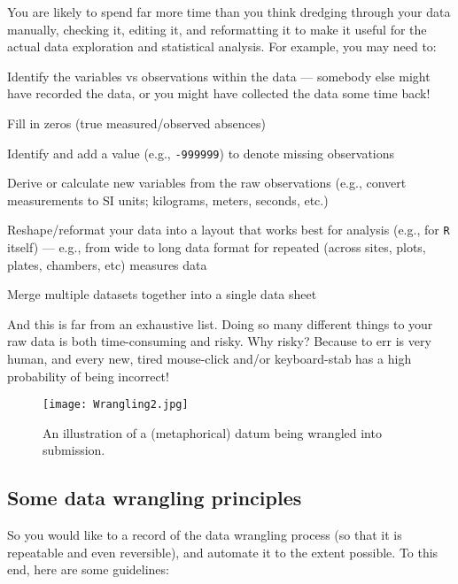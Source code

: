 You are likely to spend far more time than you think dredging through 
your data manually, checking it, editing it, and reformatting it to 
make it useful for the actual data exploration and statistical 
analysis. For example, you may need to:  
\begin{compactitem}
	\item Identify the variables vs observations within the data 
	--- somebody else might have recorded the data, or you might have 
	collected the data some time back!
	\item Fill in zeros (true measured/observed absences) 
	\item Identify and add a value (e.g., {\tt -999999}) to denote missing 
	observations	
	\item Derive or calculate new variables from the raw observations 
	(e.g., convert measurements to SI units; kilograms, meters, seconds, 
	etc.)
	\item Reshape/reformat your data into a layout that works best for 
	analysis (e.g., for {\tt R} itself) --- e.g., from wide to long data 
	format for repeated (across sites, plots, plates, chambers, etc) 
	measures data
	\item Merge multiple datasets together into a single data sheet
\end{compactitem}
And this is far from an exhaustive list. Doing so many different things 
to your raw data is both time-consuming and risky. Why risky? Because 
to err is very human, and every new, tired mouse-click and/or 
keyboard-stab has a high probability of being incorrect!  

\begin{figure}
	\begin{center}
    \texttt{[image: Wrangling2.jpg]}
\end{center}
\caption{An illustration of a (metaphorical) datum being wrangled into submission.}
\end{figure}

\subsection{Some data wrangling principles} 
So you would like to a record of the data wrangling process (so that it 
is repeatable and even reversible), and automate it to the extent 
possible. To this end, here are some guidelines:

